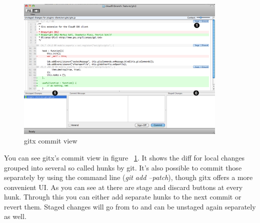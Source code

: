 \begin{figure}
	\centering
	\includegraphics[width=0.9\textwidth]{images/gitx-commit.png}
	\caption{gitx commit view}
	\label{fig:gitx-commit}
\end{figure}

You can see gitx's commit view in figure ~\ref{fig:gitx-commit}. It shows the diff for local changes grouped into several so called hunks by git.
It's also possible to commit those separately by using the command line (\emph{git add --patch}), though gitx offers a more
convenient UI.
As you can see at  there are stage and discard buttons at every hunk.
Through this you can either add separate hunks to the next commit or revert them.
Staged changes will go from  to  and can be unstaged again separately as well.